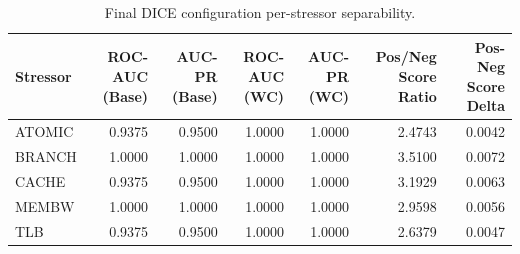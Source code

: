 \begin{table}[t]
\centering
\caption{Final DICE configuration per-stressor separability.}
\label{tab:dice_full_stressor}
\footnotesize
\begin{tabular}{lrrrrrr}
\toprule
Stressor & ROC-AUC (Base) & AUC-PR (Base) & ROC-AUC (WC) & AUC-PR (WC) & Pos/Neg Score Ratio & Pos-Neg Score Delta \\
\midrule
ATOMIC & 0.9375 & 0.9500 & 1.0000 & 1.0000 & 2.4743 & 0.0042 \\
BRANCH & 1.0000 & 1.0000 & 1.0000 & 1.0000 & 3.5100 & 0.0072 \\
CACHE & 0.9375 & 0.9500 & 1.0000 & 1.0000 & 3.1929 & 0.0063 \\
MEMBW & 1.0000 & 1.0000 & 1.0000 & 1.0000 & 2.9598 & 0.0056 \\
TLB & 0.9375 & 0.9500 & 1.0000 & 1.0000 & 2.6379 & 0.0047 \\
\bottomrule
\end{tabular}

\end{table}
